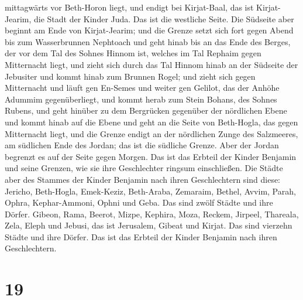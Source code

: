 mittagwärts vor Beth-Horon liegt, und endigt bei Kirjat-Baal, das ist
Kirjat-Jearim, die Stadt der Kinder Juda. Das ist die westliche Seite.
 Die Südseite aber beginnt am Ende von Kirjat-Jearim; und
die Grenze setzt sich fort gegen Abend bis zum Wasserbrunnen Nephtoach
 und geht hinab bis an das Ende des Berges, der vor dem
Tal des Sohnes Hinnom ist, welches im Tal Rephaim gegen Mitternacht
liegt, und zieht sich durch das Tal Hinnom hinab an der Südseite der
Jebusiter und kommt hinab zum Brunnen Rogel;  und zieht
sich gegen Mitternacht und läuft gen En-Semes und weiter gen Gelilot,
das der Anhöhe Adummim gegenüberliegt, und kommt herab zum Stein Bohans,
des Sohnes Rubens,  und geht hinüber zu dem Bergrücken
gegenüber der nördlichen Ebene und kommt hinab auf die Ebene
 und geht an die Seite von Beth-Hogla, das gegen
Mitternacht liegt, und die Grenze endigt an der nördlichen Zunge des
Salzmeeres, am südlichen Ende des Jordan; das ist die südliche Grenze.
 Aber der Jordan begrenzt es auf der Seite gegen Morgen.
Das ist das Erbteil der Kinder Benjamin und seine Grenzen, wie sie ihre
Geschlechter ringsum einschließen.  Die Städte aber des
Stammes der Kinder Benjamin nach ihren Geschlechtern sind diese:
Jericho,  Beth-Hogla, Emek-Keziz, Beth-Araba,
 Zemaraim, Bethel, Avvim, Parah,  Ophra,
Kephar-Ammoni, Ophni und Geba. Das sind zwölf Städte und ihre Dörfer.
 Gibeon, Rama, Beerot, Mizpe,  Kephira,
Moza, Reckem, Jirpeel, Thareala,  Zela, Eleph und Jebusi,
das ist Jerusalem, Gibeat und Kirjat.  Das sind vierzehn
Städte und ihre Dörfer. Das ist das Erbteil der Kinder Benjamin nach
ihren Geschlechtern.

\hypertarget{section-18}{%
\section{19}\label{section-18}}

